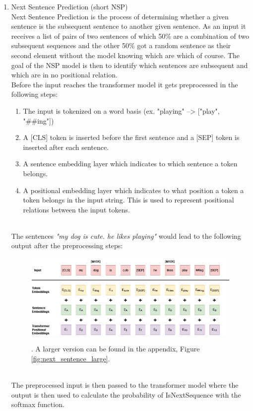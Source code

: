 \begin{enumerate}
    \item Next Sentence Prediction (short NSP) \\
    Next Sentence Prediction is the process of determining whether a given sentence is the subsequent sentence to another given sentence. As an input it receives a list of pairs of two sentences of which 50\% are a combination of two subsequent sequences and the other 50\% got a random sentence as their second element without the model knowing which are which of course. The goal of the NSP model is then to identify which sentences are subsequent and which are in no positional relation. \\
    Before the input reaches the transformer model it gets preprocessed in the following steps:
    \begin{enumerate}
        \item The input is tokenized on a word basis (ex. "playing" --> ["play", "##ing"])
        \item A [CLS] token is inserted before the first sentence and a [SEP] token is inserted after each sentence.
        \item A sentence embedding layer which indicates to which sentence a token belongs.
        \item A positional embedding layer which indicates to what position a token a token belongs in the input string. This is used to represent positional relations between the input tokens.
    \end{enumerate}\\
    The sentences \emph{"my dog is cute. he likes playing"} would lead to the following output after the preprocessing steps: 
    \begin{figure}[h]
        \centering 
        \includegraphics [width=\linewidth]{resources/NextSentence.png} \\
        \caption{\citet{Devlin2019BERTPO}. A larger version can be found in the appendix, Figure \ref{fig:next_sentence_large}.}
        \label{fig:my_label}
    \end{figure}
    \\
    The preprocessed input is then passed to the transformer model where the output is then used to calculate the probability of IsNextSequence with the softmax function.
\end{enumerate}
